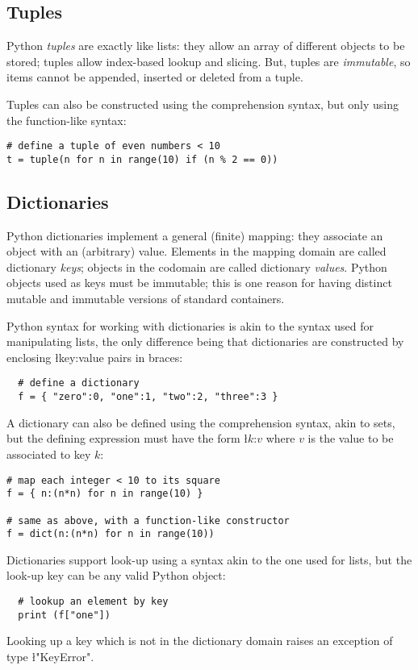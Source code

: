\subsection{Tuples}
\label{sec:tuples}

Python \emph{tuples} are exactly like lists: they allow an array of
different objects to be stored; tuples allow index-based lookup and
slicing. But, tuples are \emph{immutable}, so items cannot be
appended, inserted or deleted from a tuple.

Tuples can also be constructed using the comprehension syntax, but
only using the function-like syntax:
\begin{lstlisting}
# define a tuple of even numbers < 10
t = tuple(n for n in range(10) if (n % 2 == 0))
\end{lstlisting}


\subsection{Dictionaries}
\label{sec:dicts}

Python dictionaries implement a general (finite) mapping: they
associate an object with an (arbitrary) value.  Elements in the
mapping domain are called dictionary \emph{keys}; objects in the
codomain are called dictionary \emph{values}.  Python objects used as
keys must be immutable; this is one reason for having distinct mutable
and immutable versions of standard containers.

Python syntax for working with dictionaries is akin to the syntax used
for manipulating lists, the only difference being that dictionaries
are constructed by enclosing \l{key:value} pairs in braces:
\begin{lstlisting}
  # define a dictionary
  f = { "zero":0, "one":1, "two":2, "three":3 }
\end{lstlisting}
A dictionary can also be defined using the comprehension syntax,
akin to sets, but the defining expression must have the form
\l{$k$:$v$} where $v$ is the value to be associated to key $k$:
\begin{lstlisting}
# map each integer < 10 to its square
f = { n:(n*n) for n in range(10) }

# same as above, with a function-like constructor
f = dict(n:(n*n) for n in range(10))
\end{lstlisting}

Dictionaries support look-up using a syntax akin to the one used for
lists, but the look-up key can be any valid Python object:
\begin{lstlisting}
  # lookup an element by key
  print (f["one"])
\end{lstlisting}
Looking up a key which is not in the dictionary domain raises an
exception of type \l"KeyError".

